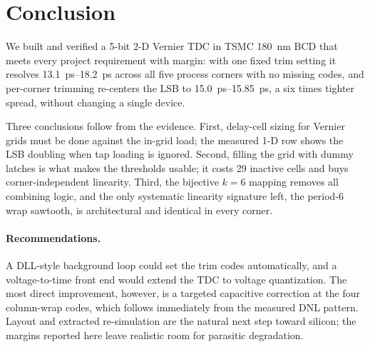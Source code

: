 \section{Conclusion}
\label{sec:conclusion}

We built and verified a 5-bit 2-D Vernier TDC in TSMC \SI{180}{\nano\meter}
BCD that meets every project requirement with margin: with one fixed trim
setting it resolves \SIrange{13.1}{18.2}{\pico\second} across all five
process corners with no missing codes, and per-corner trimming re-centers the
LSB to \SIrange{15.0}{15.85}{\pico\second}, a six times tighter spread,
without changing a single device.

Three conclusions follow from the evidence. First, delay-cell sizing for
Vernier grids must be done against the in-grid load; the measured 1-D row
shows the LSB doubling when tap loading is ignored. Second, filling the grid
with dummy latches is what makes the thresholds usable; it costs 29 inactive
cells and buys corner-independent linearity. Third, the bijective $k=6$
mapping removes all combining logic, and the only systematic linearity
signature left, the period-6 wrap sawtooth, is architectural and identical in
every corner.

\paragraph{Recommendations.}
A DLL-style background loop could set the trim codes automatically, and a
voltage-to-time front end would extend the TDC to voltage quantization. The
most direct improvement, however, is a targeted capacitive correction at the
four column-wrap codes, which follows immediately from the measured DNL
pattern. Layout and extracted re-simulation are the natural next step toward
silicon; the margins reported here leave realistic room for parasitic
degradation.
